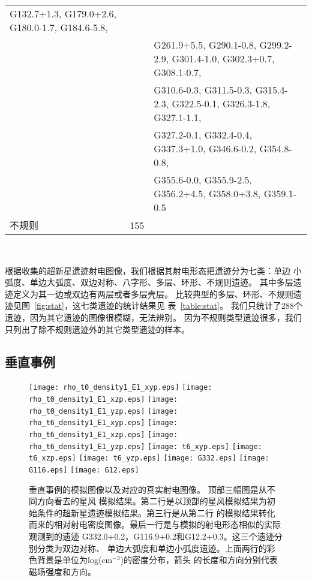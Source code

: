 \begin{table*}
\begin{tabular}{l l l}
      G132.7+1.3,  G179.0+2.6, G180.0-1.7, G184.6-5.8,\\& & G261.9+5.5, G290.1-0.8,  G299.2-2.9, G301.4-1.0, G302.3+0.7,
      G308.1-0.7,\\& & G310.6-0.3, G311.5-0.3, G315.4-2.3,  G322.5-0.1, G326.3-1.8, G327.1-1.1,\\& & G327.2-0.1,  G332.4-0.4,
      G337.3+1.0, G346.6-0.2,  G354.8-0.8,\\& & G355.6-0.0, G355.9-2.5, G356.2+4.5, G358.0+3.8, G359.1-0.5\\
      \hline
      不规则                       & 155               &\\
      \hline
  \end{tabular}\\
\end{table*}

根据\citet{West2016}收集的超新星遗迹射电图像，我们根据其射电形态把遗迹分为七类：单边
小弧度、单边大弧度、双边对称、八字形、多层、环形、不规则遗迹。
其中多层遗迹定义为其一边或双边有两层或者多层壳层。
比较典型的多层、环形、不规则遗迹见图~\ref{fig:stat}，这七类遗迹的统计结果见
表~\ref{table:stat}。
我们只统计了288个遗迹，因为其它遗迹的图像很模糊，无法辨别。
因为不规则类型遗迹很多，我们只列出了除不规则遗迹外的其它类型遗迹的样本。

\subsection{垂直事例}

\begin{figure*}
    \centering
    \texttt{[image: rho\_t0\_density1\_E1\_xyp.eps]}
    \texttt{[image: rho\_t0\_density1\_E1\_xzp.eps]}
    \texttt{[image: rho\_t0\_density1\_E1\_yzp.eps]}\newline
    \texttt{[image: rho\_t6\_density1\_E1\_xyp.eps]}
    \texttt{[image: rho\_t6\_density1\_E1\_xzp.eps]}
    \texttt{[image: rho\_t6\_density1\_E1\_yzp.eps]}\newline
    \texttt{[image: t6\_xyp.eps]}
    \texttt{[image: t6\_xzp.eps]}
    \texttt{[image: t6\_yzp.eps]}\newline
    \texttt{[image: G332.eps]}
    \texttt{[image: G116.eps]}
    \texttt{[image: G12.eps]}
    \caption{垂直事例的模拟图像以及对应的真实射电图像。 顶部三幅图是从不同方向看去的星风
    模拟结果。第二行是以顶部的星风模拟结果为初始条件的超新星遗迹模拟结果。第三行是从第二行
    的模拟结果转化而来的相对射电密度图像。最后一行是与模拟的射电形态相似的实际观测到的遗迹
    G332.0+0.2，G116.9+0.2和G12.2+0.3\citep{West2016}。这三个遗迹分别分类为双边对称、
    单边大弧度和单边小弧度遗迹。上面两行的彩色背景是单位为log(cm$^{-3}$)的密度分布，箭头
    的长度和方向分别代表磁场强度和方向。}
\label{fig:per}
\end{figure*}

